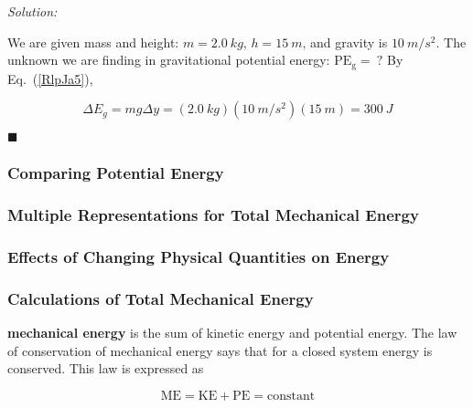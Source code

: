 \documentclass[dvipsnames]{article}
\begin{document}
\textit{Solution:} 

We are given mass and height: $m = \SI{2.0}{kg}$, $h = \SI{15}{m}$, and gravity is $\SI{10}{m/s^2}$. The unknown we are finding in gravitational potential energy: $\mathrm{PE_g} =\ ?$ By Eq.~(\ref{RlpJa5}),

\begin{equation*}
    \Delta E_g = mg \Delta y = (\SI{2.0}{kg})(\SI{10}{m/s^2})(\SI{15}{m}) =  \boxed{\SI{300}{J}}
\end{equation*}

\hfill $\blacksquare$

\subsubsection{Comparing Potential Energy}
\subsubsection{Multiple Representations for Total Mechanical Energy}
\subsubsection{Effects of Changing Physical Quantities on Energy}
\subsubsection{Calculations of Total Mechanical Energy}







\clearpage


\textbf{mechanical energy} is the sum of kinetic energy and potential energy. The law of conservation of mechanical energy says that for a closed system energy is conserved. This law is expressed as

\begin{equation} \label{QyLUh5}
    \mathrm{ME} = \mathrm{KE} + \mathrm{PE} = \mathrm{constant}
\end{equation}
\end{document}
